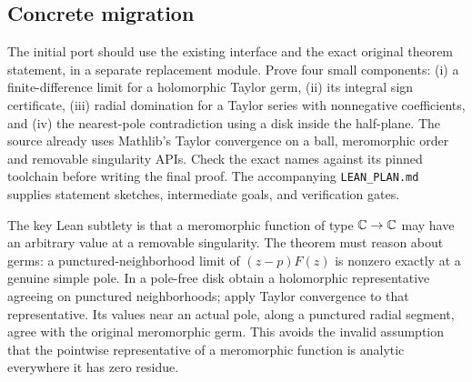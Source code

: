 \documentclass[11pt,letterpaper]{article}
\theoremstyle{remark}\newtheorem{remark}[theorem]{Remark}
\newcommand{\decl}[1]{\texttt{\detokenize{#1}}}
\begin{document}
\subsection{Concrete migration}
The initial port should use the existing \decl{IsPolar} interface and the exact original theorem statement, in a separate replacement module. Prove four small components: (i) a finite-difference limit for a holomorphic Taylor germ, (ii) its integral sign certificate, (iii) radial domination for a Taylor series with nonnegative coefficients, and (iv) the nearest-pole contradiction using a disk inside the half-plane. The source already uses Mathlib's Taylor convergence on a ball, meromorphic order and removable singularity APIs. Check the exact names against its pinned toolchain before writing the final proof. The accompanying \texttt{LEAN\_PLAN.md} supplies statement sketches, intermediate goals, and verification gates.

The key Lean subtlety is that a meromorphic function of type $\mathbb C\to\mathbb C$ may have an arbitrary value at a removable singularity. The theorem must reason about germs: a punctured-neighborhood limit of $(z-p)F(z)$ is nonzero exactly at a genuine simple pole. In a pole-free disk obtain a holomorphic representative agreeing on punctured neighborhoods; apply Taylor convergence to that representative. Its values near an actual pole, along a punctured radial segment, agree with the original meromorphic germ. This avoids the invalid assumption that the pointwise representative of a meromorphic function is analytic everywhere it has zero residue.
\end{document}
